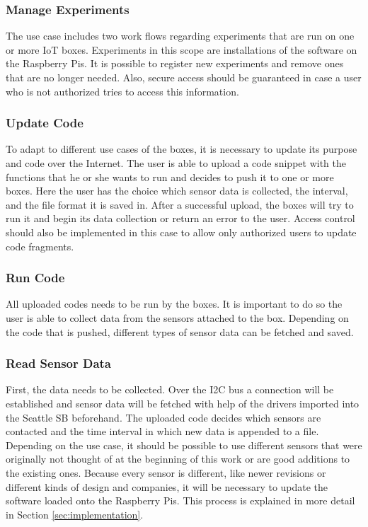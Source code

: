 \documentclass{article}      %
\begin{document}
\subsubsection{Manage Experiments} \label{sec:seattleStart}

The use case includes two work flows regarding experiments that are run on one or more \gls{IoT} boxes. Experiments in this scope are installations of the software on the Raspberry Pis. It is possible to register new experiments and remove ones that are no longer needed. Also, secure access should be guaranteed in case a user who is not authorized tries to access this information.

\subsubsection{Update Code}

To adapt to different use cases of the boxes, it is necessary to update its purpose and code over the Internet. The user is able to upload a code snippet with the functions that he or she wants to run and decides to push it to one or more boxes. Here the user has the choice which sensor data is collected, the interval, and the file format it is saved in. After a successful upload, the boxes will try to run it and begin its data collection or return an error to the user. Access control should also be implemented in this case to allow only authorized users to update code fragments.

\subsubsection{Run Code} \label{sec:seattleEnd}

All uploaded codes needs to be run by the boxes. It is important to do so the user is able to collect data from the sensors attached to the box. Depending on the code that is pushed, different types of sensor data can be fetched and saved.

\subsubsection{Read Sensor Data} \label{sec:contrStart}

First, the data needs to be collected. Over the \gls{I2C} bus a connection will be established and sensor data will be fetched with help of the drivers imported into the Seattle \gls{SB} beforehand. The uploaded code decides which sensors are contacted and the time interval in which new data is appended to a file. Depending on the use case, it should be possible to use different sensors that were originally not thought of at the beginning of this work or are good additions to the existing ones. Because every sensor is different, like newer revisions or different kinds of design and companies, it will be necessary to update the software loaded onto the Raspberry Pis. This process is explained in more detail in Section \ref{sec:implementation}.
\end{document}
